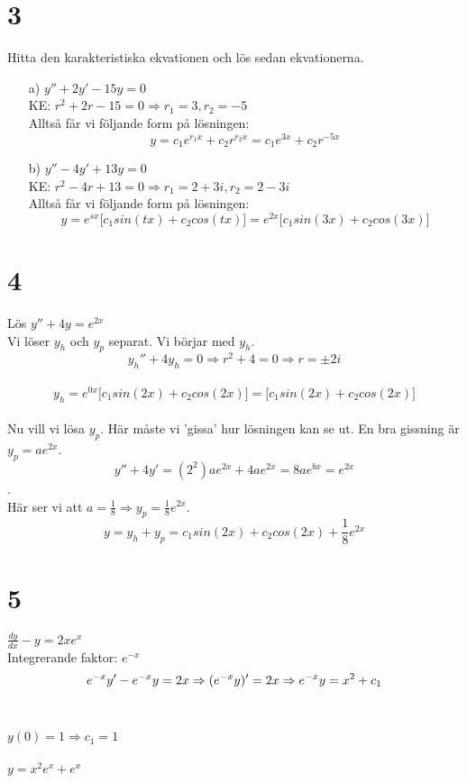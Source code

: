 \documentclass{article}
\begin{document}
\section*{3}
Hitta den karakteristiska ekvationen och lös sedan ekvationerna.
\begin{itemize}
	\item[a) ] $y'' + 2y' - 15y = 0$ \\
	KE: $r^2 + 2r - 15 = 0 \Rightarrow r_1 = 3, r_2 = -5$ \\
	Alltså får vi följande form på lösningen:
	$$ y = c_1 e^{r_1 x} + c_2 r^{r_2 x} = 
		c_1 e^{3 x} + c_2 r^{-5 x} $$
	
	
	\item[b) ] $y'' - 4y' + 13y = 0$ \\
	KE: $r^2 - 4r + 13 = 0 \Rightarrow r_1 = 2 + 3i, r_2 = 2 - 3i$ \\
	Alltså får vi följande form på lösningen:
	$$ y = e^{sx} \big[ c_1 sin(tx) + c_2 cos(tx) \big] = 
		e^{2x} \big[ c_1 sin(3x) + c_2 cos(3x) \big] $$	
	
\end{itemize} 


\clearpage
\section*{4}
Lös  \quad $y'' + 4y = e^{2x}$ \\ 
Vi löser $y_h$ och $y_p$ separat. Vi börjar med $y_h$.\\
$$y_{h}'' + 4y_{h} = 0 \Rightarrow r^2 + 4 = 0 
\Rightarrow r = \pm 2i$$ \\
$$y_{h} = e^{0x} \big[ c_1 sin(2x) + c_2 cos(2x) \big] = \big[ c_1 sin(2x) + c_2 cos(2x) \big]$$
\\ 
Nu vill vi lösa $y_p$. Här måste vi 'gissa' hur lösningen kan se ut. En bra gissning är $y_p = a e^{2x}$. \\
$$y'' + 4y' = (2^2) a e^{2x} + 4 a e^{2x} = 8 a e^{bx} = e^{2x}$$. \\
Här ser vi att $a = \frac{1}{8} \Rightarrow y_p = \frac{1}{8}e^{2x}$.
\\
$$y = y_h + y_p = c_1 sin(2x) + c_2 cos(2x)  + \frac{1}{8}e^{2x}$$

\section*{5}
$\frac{dy}{dx} - y = 2xe^x$\\
Integrerande faktor: $e^{-x}$\\
$$e^{-x}y'-e^{-x}y = 2x \Rightarrow\\ 
  (e^{-x}y)' = 2x \Rightarrow\\
  e^{-x}y = x^2 + c_1$$\\\\
$y(0) = 1 \Rightarrow c_1 = 1$\\\\
$y = x^2e^x+e^x$
\end{document}
